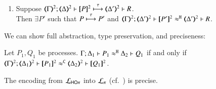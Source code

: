 \documentclass[runningheads]{llncs}
\begin{document}
{\begin{proposition}
\begin{enumerate}[1.]
		\item Suppose 
		$\stytra{\mapt{\Gamma}^{2}}{\tau}{\mapt{\Delta}^{2}}{\map{P}^{2}}{\mapt{\Delta'}^{2}}{R}$.  \\
		Then $\exists P'$ such that
					$P \stackrel{\tau}{\longmapsto} P'$
					and $\horel{\mapt{\Gamma}^{2}}{\mapt{\Delta'}^{2}}{\map{P'}^{2}}{\hwb}{\mapt{\Delta'}^{2}}{R}$.
	\end{enumerate}
\end{proposition}

We can show full abstraction, type preservation, and preciseness:

\begin{proposition}%
	\label{prop:fulla_HOp_to_p}
	Let $P_1, Q_1$ be \HOp processes.
	$\Gamma; \Delta_1 \vdash P_1 \approx^\mathtt{H} \Delta_2 \vdash Q_1$
	if and only if
	$\horel{\tmap{\Gamma}{2}}{\tmap{\Delta_1}{2}}{\pmap{P_1}{2}}{\fwb}{\tmap{\Delta_2}{2}}{\pmap{Q_1}{2}}$.
\end{proposition}




\begin{theorem}
\label{f:enc:hotopi}
The encoding from $\mathcal{L}_{\mathsf{HO}\pi}$ into $\mathcal{L}_{\pi}$ (cf.~)
is precise. 
\end{theorem}

}
\end{document}
